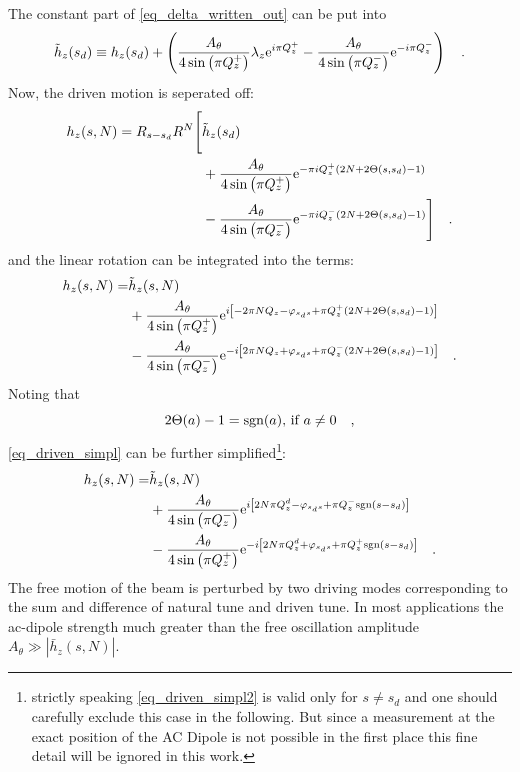 %
The constant part of \eqref{eq_delta_written_out} can be put into 
%
\begin{equation}
    \tilde{h}_z(s_d) \equiv h_z(s_d) + 
    \left(
    \frac{A_\theta}{4\sin\left( \pi Q_z^+\right)}\lambda_z \text{e}^{i \pi Q_z^+}
    -\frac{A_\theta}{4\sin\left( \pi Q_z^-\right)} \text{e}^{-i\pi Q_z^-}
    \right)
    \quad .
\end{equation}
%
Now, the driven motion is seperated off:
%
\begin{align}
    h_z(s, N) = R_{s-s_d}R^N 
    \Bigg[&\tilde{h}_z(s_d) 
    \notag \\
        &+ \frac{A_\theta}{4\sin\left( \pi Q_z^+\right)} \text{e}^{-\pi i Q_z^+(2N+2\Theta(s,s_d)-1)} 
         \notag \\
        &- \frac{A_\theta}{4\sin\left( \pi Q_z^-\right)} \text{e}^{-\pi i Q_z^-(2N+2\Theta(s,s_d) -1)}
    \Bigg]
    \quad .
    \label{eq_driven_simpl}
\end{align}
%
and the linear rotation can be integrated into the terms:
%
\begin{align}
    h_z(s, N) =
        &\tilde{h}_z(s, N) \notag \\
        &+\frac{A_\theta}{4\sin\left( \pi Q_z^+\right)}
        \text{e}^{i\left[-2\pi NQ_{z} - \varphi_{s_ds} + \pi Q_z^+(2N+2\Theta(s,s_d)-1)\right]}
        \notag\\
        &-\frac{A_\theta}{4\sin\left( \pi Q_z^-\right)}
        \text{e}^{-i\left[2\pi NQ_{z} + \varphi_{s_ds}+ \pi Q_z^-(2N + 2\Theta(s,s_d) -1)\right]}
    \quad .
    \label{eq_driven_simpl}
\end{align}
%
Noting that
%
\begin{equation}
  2\Theta(a) - 1 = \text{sgn}(a) \text{, if } a \neq 0
    \quad ,
\end{equation}
%
\eqref{eq_driven_simpl} can be further simplified\footnote{
    strictly speaking \eqref{eq_driven_simpl2} is valid only for $s\neq s_d$ and one should carefully exclude this case
    in the following. But since a measurement at the exact position of the AC Dipole is not possible in the first place
    this fine detail will be ignored in this work.
    }:
%
\begin{align}
    h_z(s, N) =
        &\tilde{h}_z(s, N) \notag \\
        &+ \frac{A_\theta}{4\sin\left( \pi Q_z^-\right)}
        \text{e}^{i\left[2N\pi Q^{d}_{z} - \varphi_{s_ds} + \pi Q_z^-\text{sgn}(s-s_d)\right]} 
        \notag \\
        &- \frac{A_\theta}{4\sin\left( \pi Q_z^+\right)}
        \text{e}^{-i\left[2N\pi Q^{d}_{z} + \varphi_{s_ds} + \pi Q_z^+\text{sgn}(s-s_d)\right]} 
    \quad .
    \label{eq_driven_simpl2}
\end{align}
%
The free motion of the beam is perturbed by two driving modes corresponding to the sum and difference
of natural tune and driven tune. In most applications the ac-dipole strength much greater than the free 
oscillation amplitude $A_\theta \gg |\bar{h}_z(s,N)|$.

